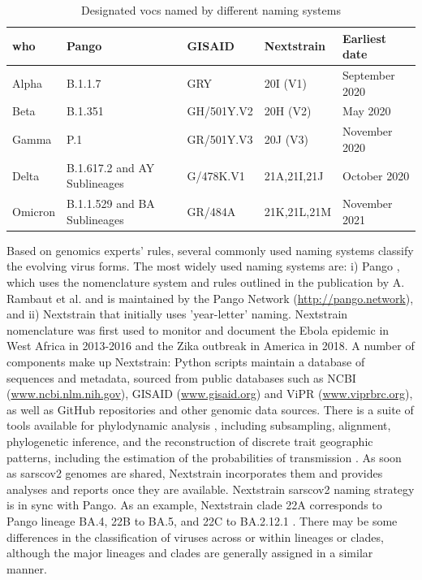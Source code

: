         \begin{table}[ht!]
            \centering
            \small
            \begin{tabular}{lllll}
            \textbf{\acrshort{who}} & \textbf{Pango}               & \textbf{GISAID}    & \textbf{Nextstrain}   & \textbf{Earliest date} \\ \hline
            Alpha                   & B.1.1.7                      & GRY                & 20I (V1)              & September 2020 \\
            Beta                    & B.1.351                      & GH/501Y.V2         & 20H (V2)              & May 2020 \\
            Gamma                   & P.1                          & GR/501Y.V3         & 20J (V3)              & November 2020 \\
            Delta                   & B.1.617.2 and AY Sublineages & G/478K.V1          & 21A,21I,21J           & October 2020 \\
            Omicron                 & B.1.1.529 and BA Sublineages & GR/484A            & 21K,21L,21M           & November 2021\\ \hline
            \end{tabular}
            \caption{Designated \acrlong{vocs} named by different naming systems} \label{tab:intro:vocs}
        \end{table}
        
        Based on genomics experts' rules, several commonly used naming systems \cite{reich} classify the evolving virus forms. The most widely used naming systems are: i) Pango \cite{otoole2021}, which uses the nomenclature system and rules outlined in the publication by A. Rambaut et al. \cite{rambaut2020} and is maintained by the Pango Network (\url{http://pango.network}), and ii) Nextstrain that initially uses 'year-letter' naming. Nextstrain nomenclature was first used to monitor and document the Ebola epidemic in West Africa in 2013-2016 and the Zika outbreak in America in 2018. A number of components make up Nextstrain: Python scripts maintain a database of sequences and metadata, sourced from public databases such as NCBI (\url{www.ncbi.nlm.nih.gov}), GISAID (\url{www.gisaid.org}) and ViPR (\url{www.viprbrc.org}), as well as GitHub repositories and other genomic data sources. There is a suite of tools available for phylodynamic analysis \cite{volz2013}, including subsampling, alignment, phylogenetic inference, and the reconstruction of discrete trait geographic patterns, including the estimation of the probabilities of transmission \cite{hadfield2018}. As soon as \acrshort{sarscov2} genomes are shared, Nextstrain incorporates them and provides analyses and reports once they are available. Nextstrain \acrshort{sarscov2} naming strategy is in sync with Pango. As an example, Nextstrain clade 22A corresponds to Pango lineage BA.4, 22B to BA.5, and 22C to BA.2.12.1 \cite{nextstrain}. There may be some differences in the classification of viruses across or within lineages or clades, although the major lineages and clades are generally assigned in a similar manner.
    
